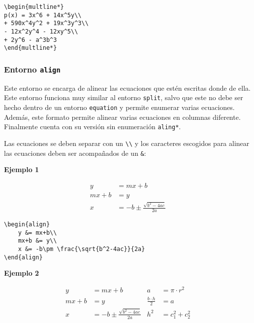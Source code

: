 \begin{myquote}
	\begin{lstlisting}
\begin{multline*}
p(x) = 3x^6 + 14x^5y\\
+ 590x^4y^2 + 19x^3y^3\\
- 12x^2y^4 - 12xy^5\\
+ 2y^6 - a^3b^3
\end{multline*}
	\end{lstlisting}
\end{myquote}

\subsubsection{Entorno \texttt{align}}

Este entorno se encarga de alinear las ecuaciones que estén escritas donde de ella. Este entorno funciona muy similar al entorno \texttt{split}, salvo que este no debe ser hecho dentro de un entorno \texttt{equation} y permite enumerar varias ecuaciones. Además, este formato permite alinear varias ecuaciones en columnas diferente. Finalmente cuenta con su versión sin enumeración \texttt{aling*}.

Las ecuaciones se deben separar con un \verb|\\| y los caracteres escogidos para alinear las ecuaciones deben ser acompañados de un \verb|&|:

\textbf{Ejemplo 1}

\begin{align}
y &= mx+b\\
mx+b &= y\\
x &= -b\pm \frac{\sqrt{b^2-4ac}}{2a}
\end{align}

\begin{myquote}
	\begin{lstlisting}
\begin{align}
	y &= mx+b\\
	mx+b &= y\\
	x &= -b\pm \frac{\sqrt{b^2-4ac}}{2a}
\end{align}
	\end{lstlisting}
\end{myquote}

\textbf{Ejemplo 2}

\begin{align}
y &= mx+b 	& 	a &= \pi \cdot r^2\\
mx+b &= y 	& 	\frac{b\cdot h}{2} &= a\\
x &= -b\pm \frac{\sqrt{b^2-4ac}}{2a} & h^2 &= c_1^2+c_2^2
\end{align}

